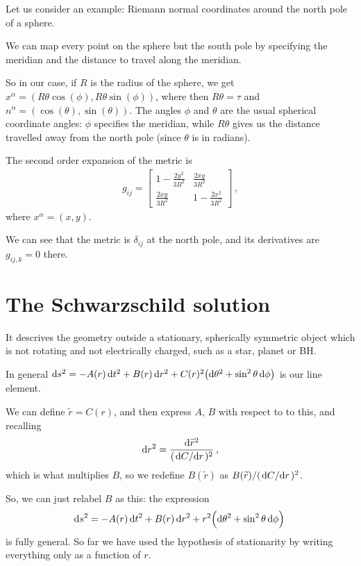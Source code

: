 \documentclass[main.tex]{subfiles}
\begin{document}
Let us consider an example: Riemann normal coordinates around the north pole of a sphere.

We can map every point on the sphere but the south pole by specifying the meridian and the distance to travel along the meridian.

So in our case, if \(R\) is the radius of the sphere, we get \(x^{\alpha } = (R \theta \cos(\phi ), R \theta \sin(\phi ))\), where then \(R \theta = \tau \) and \(n^{\alpha } = (\cos(\theta ), \sin(\theta ))\).
The angles \(\phi \) and \(\theta \) are the usual spherical coordinate angles: \(\phi \) specifies the meridian, while \(R\theta \) gives us the distance travelled away from the north pole (since \(\theta \) is in radians).

The second order expansion of the metric is 
%
\begin{align}
  g_{ij} = \left[\begin{array}{cc}
  1 - \frac{2y^2}{3R^2} & \frac{2xy}{3R^2} \\ 
  \frac{2xy}{3R^2} & 1-\frac{2x^2}{3R^2}
  \end{array}\right]
\,,
\end{align}
%
where \(x^{\alpha } = (x, y)\).

We can see that the metric is \(\delta_{ij}\) at the north pole, and its derivatives are \(g_{ij,k}= 0\) there.

\section{The Schwarzschild solution}

It descrives the geometry outside a stationary, spherically symmetric object which is not rotating and not electrically charged, such as a star, planet or BH.

In general \(\dd{s^2} = -A(r) \dd{t^2} + B(r) \dd{r^2} + C(r)^2 \qty(\dd{\theta^2} + \sin^2 \theta \dd{\phi })\) is our line element.

We can define \(\widetilde{r} = C(r)\), and then express \(A\), \(B\) with respect to to this, and recalling 
%
\begin{align}
    \dd{r^2} = 
  \frac{\dd{\widetilde{r}^2} }{(\dv*{C}{r})^2}
\,,
\end{align}
%
which is what multiplies \(B\), so we redefine \(B(\widetilde{r}) \) as \(B(\widetilde{r}) / (\dv*{C}{r})^2\).

So, we can just relabel \(B\) as this: the expression 
%
\begin{align}
    \dd{s^2} = -A(r) \dd{t^2} + B(r) \dd{r^2} + r^2\qty(\dd{\theta^2} + \sin^2 \theta \dd{\phi })
\,
\end{align}
%
is fully general. So far we have used the hypothesis of stationarity by writing everything only as a function of \(r\).
\end{document}

